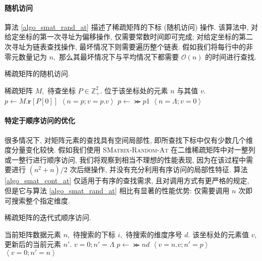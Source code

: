 \paragraph{随机访问} 算法 \ref{algo_smat_rand_at} 描述了稀疏矩阵的下标 (随机访问) 操作. 该算法中, 对给定坐标的第一次寻址为偏移操作, 仅需要常数时间即可完成; 对给定坐标的第二次寻址为链表查找操作, 最坏情况下则需要遍历整个链表. 假如我们将每行中的非零元数量记为 $n,$ 那么其最坏情况下与平均情况下都需要 $\mathcal{O}(n)$ 的时间进行查找.
\begin{breakablealgorithm}
\caption{稀疏矩阵的随机访问.}
\label{algo_smat_rand_at}
\begin{algorithmic}[1]
\Require 稀疏矩阵 $M,$ 待查坐标 $P \in \mathbb{Z}_{+}^{2}.$
\Ensure 位于该坐标处的元素 $n$ 与其值 $v.$
    \State $p \gets M.\bm{r}[P[0]]$
            \State \Return $\left\langle n=p; v=p.v \right\rangle$
        \EndIf
        \State $p \gets \Succ{p}{1}$
    \EndWhile
    \State \Return $\left\langle n=\Lambda; v=0 \right\rangle$
\EndFunction
\end{algorithmic}
\end{breakablealgorithm}

\paragraph{特定于顺序访问的优化} 很多情况下, 对矩阵元素的查找具有空间局部性, 即所查找下标中仅有少数几个维度分量变化较快. 假如我们使用 \textsc{SMatrix-Random-At} 在二维稀疏矩阵中对一整列或一整行进行顺序访问, 我们将观察到相当不理想的性能表现, 因为在该过程中需要进行 $(n^2 + n) / 2$ 次后继操作, 并没有充分利用有序访问的局部性特征. 算法 \ref{algo_smat_cont_at} 仅适用于有序的查找需求, 且对调用方式有更严格的规定, 但是它与算法 \ref{algo_smat_rand_at} 相比有显著的性能优势: 仅需要调用 $n$ 次即可搜索整个指定维度.
\begin{breakablealgorithm}
\caption{稀疏矩阵的迭代式顺序访问.}
\label{algo_smat_cont_at}
\begin{algorithmic}[1]
\Require 当前矩阵数据元素 $n,$ 待搜索的下标 $i,$ 待搜索的维度序号 $d.$
\Ensure 该坐标处的元素值 $v,$ 更新后的当前元素 $n'.$
        \State \Return $v=0; n'=\Lambda$
    \EndIf
    \State $p \gets \Succ{n}{d}$
        \State \Return $\left\langle v=n.v; n'=p \right\rangle$
    \EndIf
    \State \Return $\left\langle v=0; n'=n \right\rangle$
\EndFunction
\end{algorithmic}
\end{breakablealgorithm}

